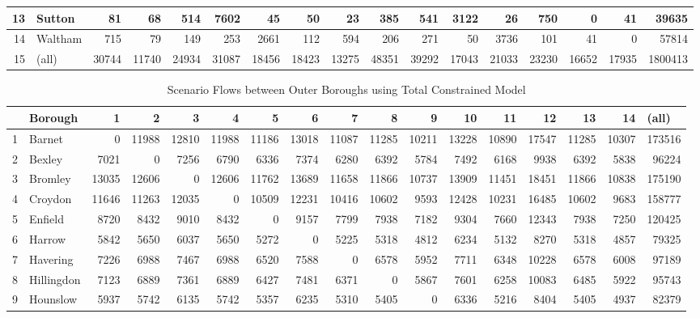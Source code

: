 \documentclass[11pt]{article} %
\begin{document}
\begin{table}
\begin{tabular}{|r|l|r|r|r|r|r|r|r|r|r|r|r|r|r|r|r|}
13 & Sutton & 81 & 68 & 514 & 7602 & 45 & 50 & 23 & 385 & 541 & 3122 & 26 & 750 & 0 & 41 & 39635 \\ \hline
14 & Waltham & 715 & 79 & 149 & 253 & 2661 & 112 & 594 & 206 & 271 & 50 & 3736 & 101 & 41 & 0 & 57814 \\ \hline
15 & (all) & 30744 & 11740 & 24934 & 31087 & 18456 & 18423 & 13275 & 48351 & 39292 & 17043 & 21033 & 23230 & 16652 & 17935 & 1800413 \\ \hline
\end{tabular}
\label{Actual Flows Outer}
\end{table}


\begin{table}
\footnotesize
\caption{Scenario Flows between Outer Boroughs using Total Constrained Model}
\begin{tabular}{|r|l|r|r|r|r|r|r|r|r|r|r|r|r|r|r|r|}
\hline
\multicolumn{1}{|l|}{} & Borough & 1 & 2 & 3 & 4 & 5 & 6 & 7 & 8 & 9 & 10 & 11 & 12 & 13 & 14 & \multicolumn{1}{l|}{(all)} \\ \hline
1 & Barnet & 0 & 11988 & 12810 & 11988 & 11186 & 13018 & 11087 & 11285 & 10211 & 13228 & 10890 & 17547 & 11285 & 10307 & 173516 \\ \hline
2 & Bexley & 7021 & 0 & 7256 & 6790 & 6336 & 7374 & 6280 & 6392 & 5784 & 7492 & 6168 & 9938 & 6392 & 5838 & 96224 \\ \hline
3 & Bromley & 13035 & 12606 & 0 & 12606 & 11762 & 13689 & 11658 & 11866 & 10737 & 13909 & 11451 & 18451 & 11866 & 10838 & 175190 \\ \hline
4 & Croydon & 11646 & 11263 & 12035 & 0 & 10509 & 12231 & 10416 & 10602 & 9593 & 12428 & 10231 & 16485 & 10602 & 9683 & 158777 \\ \hline
5 & Enfield & 8720 & 8432 & 9010 & 8432 & 0 & 9157 & 7799 & 7938 & 7182 & 9304 & 7660 & 12343 & 7938 & 7250 & 120425 \\ \hline
6 & Harrow & 5842 & 5650 & 6037 & 5650 & 5272 & 0 & 5225 & 5318 & 4812 & 6234 & 5132 & 8270 & 5318 & 4857 & 79325 \\ \hline
7 & Havering & 7226 & 6988 & 7467 & 6988 & 6520 & 7588 & 0 & 6578 & 5952 & 7711 & 6348 & 10228 & 6578 & 6008 & 97189 \\ \hline
8 & Hillingdon & 7123 & 6889 & 7361 & 6889 & 6427 & 7481 & 6371 & 0 & 5867 & 7601 & 6258 & 10083 & 6485 & 5922 & 95743 \\ \hline
9 & Hounslow & 5937 & 5742 & 6135 & 5742 & 5357 & 6235 & 5310 & 5405 & 0 & 6336 & 5216 & 8404 & 5405 & 4937 & 82379 \\ \hline

\end{tabular}
\end{table}
\end{document}
